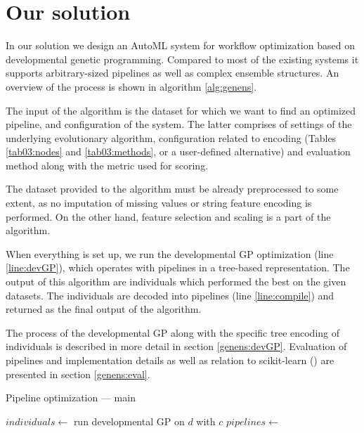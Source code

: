 \chapter{Our solution} \label{our:solution}

In our solution we design an AutoML system for workflow optimization based on
developmental genetic programming. Compared to most of the existing systems it supports 
arbitrary-sized pipelines as well as complex ensemble structures. An overview
of the process is shown in algorithm \ref{alg:genens}.

The input of the
algorithm is the dataset for which we want to find an optimized pipeline, and
configuration of the system. The latter comprises of settings of the
underlying evolutionary algorithm, configuration related to encoding (Tables
\ref{tab03:nodes} and \ref{tab03:methods}, or a user-defined alternative) and
evaluation method along with the metric used for scoring.

The dataset provided to the algorithm must be already preprocessed to some
extent, as no imputation of missing values or string feature encoding is
performed. On the other hand, feature selection and scaling is a part of
the algorithm.

When everything is set up, we run the developmental GP optimization
(line \ref{line:devGP}), which operates with pipelines in a tree-based
representation. The output of this algorithm are individuals which
performed the best on the given datasets. The individuals are decoded into
pipelines (line \ref{line:compile}) and returned as the final output of the
algorithm.

The process of the developmental GP along with the specific tree encoding of
individuals is described in more detail in section \ref{genens:devGP}. 
Evaluation of pipelines and implementation details as well as relation to
scikit-learn (\cite{scikit-learn}) are presented in section \ref{genens:eval}.

\begin{algorithm}
\DontPrintSemicolon 
\caption{Pipeline optimization --- main\label{alg:genens}}
  \;
  $individuals \longleftarrow$ run developmental GP on $d$ with $c$ \label{line:devGP} \;
  $pipelines \longleftarrow$  \label{line:compile}
  \;\;
  
\end{algorithm}


